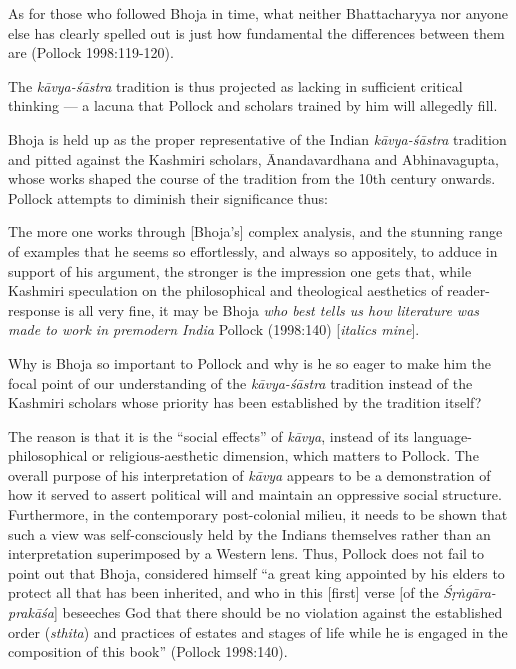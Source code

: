 \begin{myquote}
As for those who followed Bhoja in time, what neither Bhattacharyya nor anyone else has clearly spelled out is just how fundamental the differences between them are 
\hfill (Pollock 1998:119-120).  
\end{myquote}


The \textsl{kāvya-śāstra} tradition is thus projected as lacking in sufficient critical thinking --- a lacuna that Pollock and scholars trained by him will allegedly fill.

Bhoja is held up as the proper representative of the Indian \textsl{kāvya-śāstra} tradition and pitted against the Kashmiri scholars, Ānandavardhana and Abhinavagupta, whose works shaped the course of the tradition from the 10th century onwards. Pollock attempts to diminish their significance thus:

\begin{myquote}
The more one works through [Bhoja's] complex analysis, and the stunning range of examples that he seems so effortlessly, and always so appositely, to adduce in support of his argument, the stronger is the impression one gets that, while Kashmiri speculation on the philosophical and theological aesthetics of reader-response is all very fine, it may be Bhoja \textsl{who best tells us how literature was made to work in premodern India} 
\hfill Pollock (1998:140) [\textsl{italics mine}].
\end{myquote}

Why is Bhoja so important to Pollock and why is he so eager to make him the focal point of our understanding of the \textsl{kāvya-śāstra} tradition instead of the Kashmiri scholars whose priority has been established by the tradition itself? 

The reason is that it is the ``social effects'' of \textsl{kāvya}, instead of its language-philosophical or religious-aesthetic dimension, which matters to Pollock. The overall purpose of his interpretation of \textsl{kāvya} appears to be a demonstration of how it served to assert political will and maintain an oppressive social structure. Furthermore, in the contemporary post-colonial milieu, it needs to be shown that such a view was self-consciously held by the Indians themselves rather than an interpretation superimposed by a Western lens. Thus, Pollock does not fail to point out that Bhoja, considered himself ``a great king appointed by his elders to protect all that has been inherited, and who in this [first] verse [of the \textsl{Śṛṅgāra-prakāśa}] beseeches God that there should be no violation against the established order (\textsl{sthita}) and practices of estates and stages of life while he is engaged in the composition of this book'' (Pollock 1998:140).

